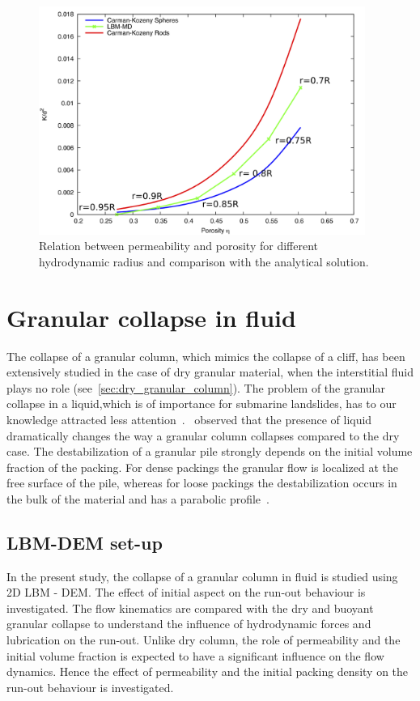\begin{figure}[htpb]
\centering
\includegraphics[width=0.95\textwidth]{Carman}
\caption{Relation between permeability and porosity for 
different hydrodynamic radius and comparison with the analytical solution.}
\label{fig:Carman}
\end{figure}


\section{Granular collapse in fluid}

The collapse of a granular column, which mimics the
collapse of a cliff, has been extensively studied in the case of
dry granular material, when the interstitial fluid plays no
role (see~\cref{sec:dry_granular_column}). The problem of the granular collapse 
in a liquid,which is of importance for submarine landslides, has to our
knowledge attracted less attention~\citep{Rondon2011}.~\citet{Thompson2007} 
observed that the presence of liquid dramatically changes the way a granular 
column collapses compared to the dry case. The destabilization of a granular 
pile strongly depends on the initial volume fraction of the packing. For dense 
packings the granular flow is localized at the free surface of the pile, 
whereas for loose packings the destabilization occurs in the bulk of the
material and has a parabolic profile~\citep{Bonnet2010,Topin2011,Iverson2000}. 

\subsection{LBM-DEM set-up}

In the present study, the collapse of a granular column in fluid is studied 
using 2D LBM - DEM. The effect of initial aspect on the run-out behaviour is 
investigated. The flow kinematics are compared with the dry and buoyant 
granular collapse to understand the influence of hydrodynamic forces and 
lubrication on the run-out. Unlike dry column, the role of permeability and the 
initial volume fraction is expected to have a significant influence on the flow 
dynamics. Hence the effect of permeability and the initial packing density on 
the run-out behaviour is investigated.

